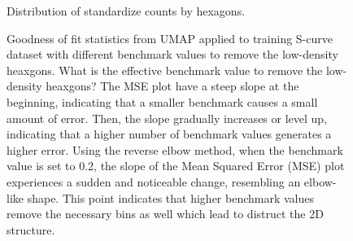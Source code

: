 \documentclass[
  12pt]{article}
\begin{document}
\begin{figure}[H]


\caption{\label{fig-stdctsScurve}Distribution of standardize counts by
hexagons.}

\end{figure}%

\begin{figure}


\caption{\label{fig-diagnosticpltScurvelwd}Goodness of fit statistics
from UMAP applied to training S-curve dataset with different benchmark
values to remove the low-density heaxgons. What is the effective
benchmark value to remove the low-density heaxgons? The MSE plot have a
steep slope at the beginning, indicating that a smaller benchmark causes
a small amount of error. Then, the slope gradually increases or level
up, indicating that a higher number of benchmark values generates a
higher error. Using the reverse elbow method, when the benchmark value
is set to 0.2, the slope of the Mean Squared Error (MSE) plot
experiences a sudden and noticeable change, resembling an elbow-like
shape. This point indicates that higher benchmark values remove the
necessary bins as well which lead to distruct the 2D structure.}

\end{figure}%
\end{document}
